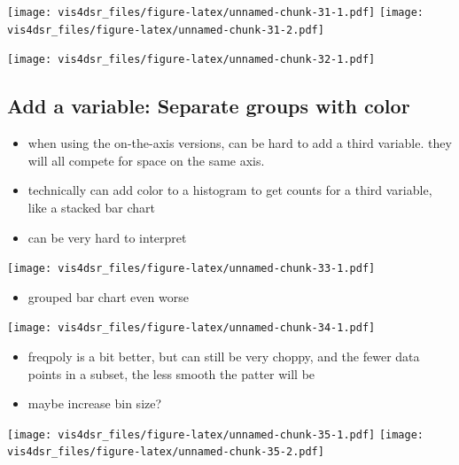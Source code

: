 \documentclass[
]{krantz}
\providecommand{\tightlist}{%
  \setlength{\itemsep}{0pt}\setlength{\parskip}{0pt}}
\begin{document}
\texttt{[image: vis4dsr\_files/figure-latex/unnamed-chunk-31-1.pdf]} \texttt{[image: vis4dsr\_files/figure-latex/unnamed-chunk-31-2.pdf]}

\texttt{[image: vis4dsr\_files/figure-latex/unnamed-chunk-32-1.pdf]}

\hypertarget{add-a-variable-separate-groups-with-color}{%
\subsection{Add a variable: Separate groups with color}\label{add-a-variable-separate-groups-with-color}}

\begin{itemize}
\tightlist
\item
  when using the on-the-axis versions, can be hard to add a third variable. they
  will all compete for space on the same axis.
\item
  technically can add color to a histogram to get counts for a third variable,
  like a stacked bar chart
\item
  can be very hard to interpret
\end{itemize}

\texttt{[image: vis4dsr\_files/figure-latex/unnamed-chunk-33-1.pdf]}

\begin{itemize}
\tightlist
\item
  grouped bar chart even worse
\end{itemize}

\texttt{[image: vis4dsr\_files/figure-latex/unnamed-chunk-34-1.pdf]}

\begin{itemize}
\tightlist
\item
  freqpoly is a bit better, but can still be very choppy, and the fewer data
  points in a subset, the less smooth the patter will be
\item
  maybe increase bin size?
\end{itemize}

\texttt{[image: vis4dsr\_files/figure-latex/unnamed-chunk-35-1.pdf]} \texttt{[image: vis4dsr\_files/figure-latex/unnamed-chunk-35-2.pdf]}
\end{document}
